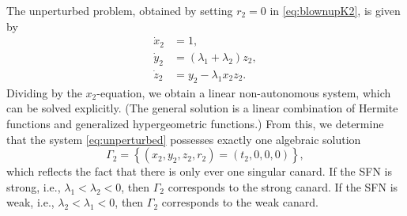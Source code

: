 \documentclass[10pt,onecolumn]{article}
\theoremstyle{plain}
\begin{document}
The unperturbed problem, obtained by setting $r_2 = 0$ in \eqref{eq:blownupK2}, is given by 
%
\begin{equation} \label{eq:unperturbed}
  \begin{split}
    \dot x_2 &= 1, \\ 
    \dot y_2 &= (\lambda_1+\lambda_2) z_2, \\ 
    \dot z_2 &= y_2 - \lambda_1 x_2 z_2.
  \end{split}
\end{equation}
%
Dividing by the $x_2$-equation, we obtain a linear non-autonomous system, which can be solved explicitly. 
%
%
(The general solution is a linear combination of Hermite functions and generalized hypergeometric functions.)
From this, we determine that the system \eqref{eq:unperturbed} possesses exactly one algebraic solution 
%
\[ \Gamma_2 = \left\{ (x_2,y_2,z_2,r_2) = \left( t_2, 0, 0, 0 \right)  \right\}, \]
%
which reflects the fact that there is only ever one singular canard. 
If the SFN is strong, i.e., $\lambda_1<\lambda_2<0$, then $\Gamma_2$ corresponds to the strong canard. 
If the SFN is weak, i.e., $\lambda_2<\lambda_1<0$, then $\Gamma_2$ corresponds to the weak canard. 
\end{document}
